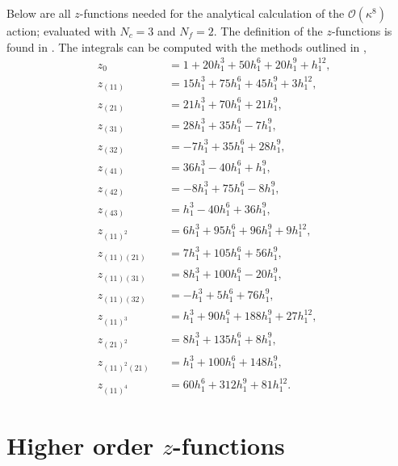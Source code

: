 Below are all $z$-functions needed for the analytical calculation of the
$\mathcal{O}(\kappa^8)$ action; evaluated with $N_c = 3$ and $N_f = 2$. The
definition of the $z$-functions is found in . The
integrals can be computed with the methods outlined in ,
%
\begin{subequations}
\begin{alignat}{4}
  &z_0 &&= 1 + 20 h_1^3 + 50 h_1^6 + 20 h_1^9 + h_1^{12}, \\
  &z_{(11)} &&= 15 h_1^3 + 75 h_1^6 + 45 h_1^9 + 3 h_1^{12}, \\
  &z_{(21)} &&= 21 h_1^3 + 70 h_1^6 + 21 h_1^9, \\
  &z_{(31)} &&= 28 h_1^3 + 35 h_1^6 - 7 h_1^9, \\
  &z_{(32)} &&= -7 h_1^3 + 35 h_1^6 + 28 h_1^9, \\
  &z_{(41)} &&= 36 h_1^3 - 40 h_1^6 + h_1^9, \\
  &z_{(42)} &&= -8 h_1^3 + 75 h_1^6 - 8 h_1^9, \\
  &z_{(43)} &&= h_1^3 - 40 h_1^6 + 36 h_1^9, \\
  &z_{(11)^2} &&= 6 h_1^3 + 95 h_1^6 + 96 h_1^9 + 9 h_1^{12}, \\
  &z_{(11)(21)} &&= 7 h_1^3 + 105 h_1^6 + 56 h_1^9, \\
  &z_{(11)(31)} &&= 8 h_1^3 + 100 h_1^6 - 20 h_1^9, \\
  &z_{(11)(32)} &&= -h_1^3 + 5 h_1^6 + 76 h_1^9, \\
  &z_{(11)^3} &&= h_1^3 + 90 h_1^6 + 188 h_1^9 + 27 h_1^{12}, \\
  &z_{(21)^2} &&= 8 h_1^3 + 135 h_1^6 + 8 h_1^9, \\
  &z_{(11)^2(21)} &&= h_1^3 + 100 h_1^6 + 148 h_1^9, \\
  &z_{(11)^4} &&= 60 h_1^6 + 312 h_1^9 + 81 h_1^{12}.
\end{alignat}
\end{subequations}


\section{Higher order \texorpdfstring{$z$}{z}-functions}

